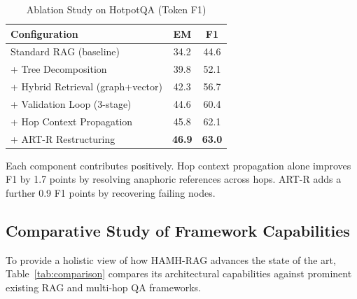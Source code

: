 \documentclass[conference]{IEEEtran}
\begin{document}
\begin{table}[!t]
\renewcommand{\arraystretch}{1.3}
\caption{Ablation Study on HotpotQA (Token F1)}
\label{tab:ablation}
\centering
\begin{tabular}{@{}lcc@{}}
\toprule
\textbf{Configuration} & \textbf{EM} & \textbf{F1} \\
\midrule
Standard RAG (baseline)           & 34.2 & 44.6 \\
+ Tree Decomposition              & 39.8 & 52.1 \\
+ Hybrid Retrieval (graph+vector) & 42.3 & 56.7 \\
+ Validation Loop (3-stage)       & 44.6 & 60.4 \\
+ Hop Context Propagation         & 45.8 & 62.1 \\
+ ART-R Restructuring             & \textbf{46.9} & \textbf{63.0} \\
\bottomrule
\end{tabular}
\end{table}

Each component contributes positively. Hop context propagation alone
improves F1 by 1.7 points by resolving anaphoric references across hops.
ART-R adds a further 0.9 F1 points by recovering failing nodes.

\subsection{Comparative Study of Framework Capabilities}
\label{sec:comparative}

To provide a holistic view of how HAMH-RAG advances the state of the art, Table~\ref{tab:comparison} compares its architectural capabilities against prominent existing RAG and multi-hop QA frameworks.
\end{document}

